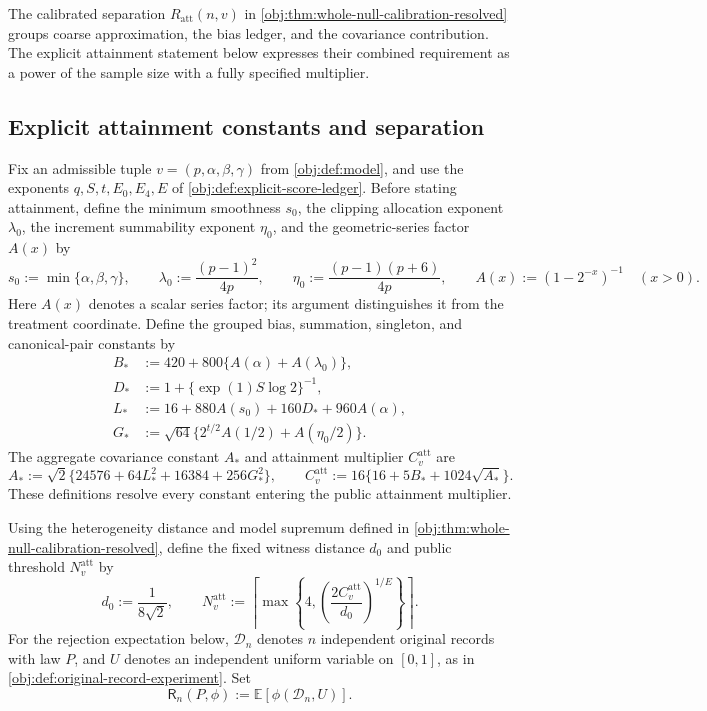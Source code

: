 \documentclass[11pt]{article}
\begin{document}
The calibrated separation \(R_{\mathrm{att}}(n,v)\) in \cref{obj:thm:whole-null-calibration-resolved} groups coarse approximation, the bias ledger, and the covariance contribution. The explicit attainment statement below expresses their combined requirement as a power of the sample size with a fully specified multiplier.

\subsection{Explicit attainment constants and separation}

Fix an admissible tuple \(v=(p,\alpha,\beta,\gamma)\) from \cref{obj:def:model}, and use the exponents \(q,S,t,E_0,E_4,E\) of \cref{obj:def:explicit-score-ledger}. Before stating attainment, define the minimum smoothness \(s_0\), the clipping allocation exponent \(\lambda_0\), the increment summability exponent \(\eta_0\), and the geometric-series factor \(A(x)\) by
\[
s_0:=\min\{\alpha,\beta,\gamma\},
\qquad
\lambda_0:=\frac{(p-1)^2}{4p},
\qquad
\eta_0:=\frac{(p-1)(p+6)}{4p},
\qquad
A(x):=(1-2^{-x})^{-1}\quad(x>0).
\]
Here \(A(x)\) denotes a scalar series factor; its argument distinguishes it from the treatment coordinate. Define the grouped bias, summation, singleton, and canonical-pair constants by
\[
\begin{aligned}
B_*&:=420+800\{A(\alpha)+A(\lambda_0)\},\\
D_*&:=1+\{\exp(1)S\log 2\}^{-1},\\
L_*&:=16+880A(s_0)+160D_*+960A(\alpha),\\
G_*&:=\sqrt{64}\{2^{t/2}A(1/2)+A(\eta_0/2)\}.
\end{aligned}
\]
The aggregate covariance constant \(A_*\) and attainment multiplier \(C^{\mathrm{att}}_v\) are
\[
A_*:=\sqrt{2}\{24576+64L_*^2+16384+256G_*^2\},
\qquad
C^{\mathrm{att}}_v:=16\{16+5B_*+1024\sqrt{A_*}\}.
\]
These definitions resolve every constant entering the public attainment multiplier.

Using the heterogeneity distance and model supremum defined in \cref{obj:thm:whole-null-calibration-resolved}, define the fixed witness distance \(d_0\) and public threshold \(N^{\mathrm{att}}_v\) by
\[
d_0:=\frac{1}{8\sqrt{2}},
\qquad
N^{\mathrm{att}}_v
:=\left\lceil\max\left\{4,
\left(\frac{2C^{\mathrm{att}}_v}{d_0}\right)^{1/E}\right\}\right\rceil.
\]
For the rejection expectation below, \(\mathcal D_n\) denotes \(n\) independent original records with law \(P\), and \(U\) denotes an independent uniform variable on \([0,1]\), as in \cref{obj:def:original-record-experiment}. Set
\[
\mathsf R_n(P,\phi):=\mathbb E[\phi(\mathcal D_n,U)].
\]
\end{document}
